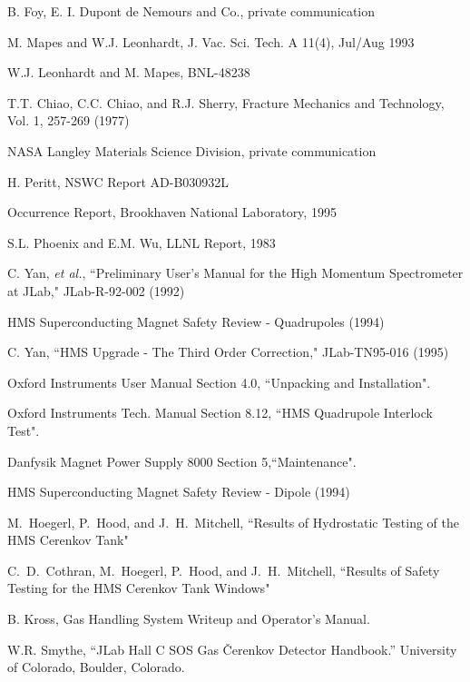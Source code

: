 %
%
 B. Foy, E. I. Dupont de Nemours and Co., private communication

 M. Mapes and W.J. Leonhardt, J. Vac. Sci. Tech. A 11(4),
Jul/Aug 1993

 W.J. Leonhardt and M. Mapes, BNL-48238


 T.T. Chiao, C.C. Chiao, and R.J. Sherry, Fracture Mechanics
and Technology, Vol. 1, 257-269 (1977)

 NASA Langley Materials Science Division, private communication

 H. Peritt, NSWC Report AD-B030932L

 Occurrence Report, Brookhaven National Laboratory, 1995

  S.L. Phoenix and E.M. Wu, LLNL Report, 1983

 C. Yan, {\em et al.}, ``Preliminary User's Manual for the High 
Momentum Spectrometer at JLab," JLab-R-92-002 (1992)

 HMS Superconducting Magnet Safety Review - Quadrupoles (1994)

 C. Yan, ``HMS Upgrade - The Third Order Correction," 
JLab-TN95-016 (1995)

 Oxford Instruments User Manual Section 4.0, 
``Unpacking and Installation".

 Oxford Instruments Tech. Manual Section 8.12,
``HMS Quadrupole Interlock Test".

 Danfysik Magnet Power Supply 8000 Section 5,``Maintenance".

 HMS Superconducting Magnet Safety Review - Dipole (1994)


 M.~Hoegerl, P.~Hood, and J.~H.~Mitchell,
``Results of Hydrostatic Testing of the HMS Cerenkov Tank"

 C.~D.~Cothran, M.~Hoegerl, P.~Hood, and J.~H.~Mitchell,
``Results of Safety Testing for the HMS Cerenkov Tank Windows"

 B. Kross, Gas Handling System Writeup and Operator's Manual.

W.R. Smythe, ``JLab Hall C SOS Gas \v{C}erenkov
Detector Handbook.''  University of Colorado, Boulder, Colorado.

